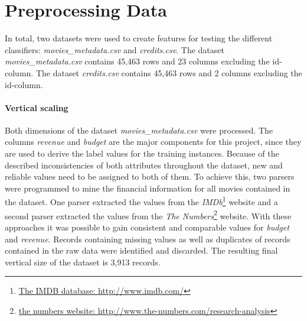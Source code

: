 \section{Preprocessing Data}
\label{cha:preprocessing}

In total, two datasets were used to create features for testing the different classifiers:
\textit{movies\_metadata.csv} and \textit{credits.csv}. The dataset \textit{movies\_metadata.csv} contains 45,463 rows and 23 columns excluding the id-column. The dataset \textit{credits.csv} contains 45,463 rows and 2 columns excluding the id-column.

\paragraph{Vertical scaling}
Both dimensions of the dataset \textit{movies\_metadata.csv} were processed. 
The columns \textit{revenue} and \textit{budget} are the major components for this project, since they are used to derive the label values for the training instances. Because of the described inconsistencies of both attributes throughout the dataset, new and reliable values need to be assigned to both of them. To achieve this, two parsers were programmed to mine the financial information for all movies contained in the dataset. One parser extracted the values from the \textit{IMDb}\footnote{\hyperref{http://www.imdb.com/}{external_sources}{ref:IMDB}{The IMDB database: http://www.imdb.com/}} website and a second parser extracted the values from the \textit{The Numbers}\footnote{\hyperref{http://www.the-numbers.com/research-analysis}{external_sources}{ref:numbers}{the numbers website: http://www.the-numbers.com/research-analysis}} website. With these approaches it was possible to gain consistent and comparable values for \textit{budget} and \textit{revenue}. Records containing missing values as well as duplicates of records contained in the raw data were identified and discarded. The resulting final vertical size of the dataset is 3,913 records.

 

